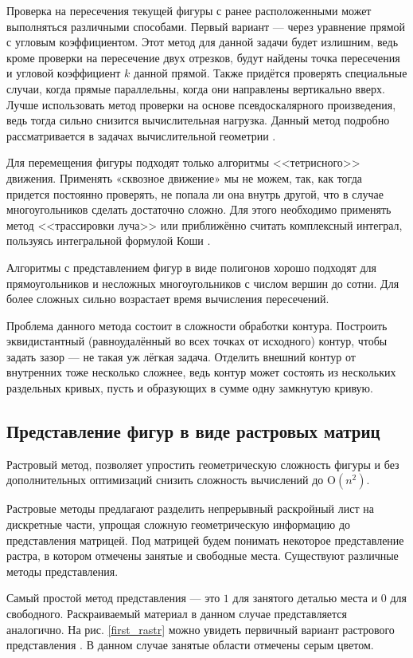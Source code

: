 \documentclass[14pt]{extarticle}
\begin{document}
	Проверка на пересечения текущей фигуры с ранее расположенными может выполняться различными способами. Первый вариант --- через уравнение прямой с угловым коэффициентом. Этот метод для данной задачи будет излишним, ведь кроме проверки на пересечение двух отрезков, будут найдены точка пересечения и угловой коэффициент $k$ данной прямой. Также придётся проверять специальные случаи, когда прямые параллельны, когда они направлены вертикально вверх. Лучше использовать метод проверки на основе псевдоскалярного произведения, ведь тогда сильно снизится вычислительная нагрузка. Данный метод подробно рассматривается в задачах вычислительной геометрии \cite{Parsolov}.


	Для перемещения фигуры подходят только алгоритмы <<тетрисного>> движения. Применять «сквозное движение» мы не можем, так, как тогда придется постоянно проверять, не попала ли она внутрь другой, что в случае многоугольников сделать достаточно сложно. Для этого необходимо применять метод <<трассировки луча>> или приближённо считать комплексный интеграл, пользуясь интегральной формулой Коши \cite{Shabat}.


	Алгоритмы с представлением фигур в виде полигонов хорошо подходят для прямоугольников и несложных многоугольников с числом вершин до сотни. Для более сложных сильно возрастает время вычисления пересечений.


	Проблема данного метода состоит в сложности обработки контура. Построить эквидистантный (равноудалённый во всех точках от исходного) контур, чтобы задать зазор --- не
	такая уж лёгкая задача. Отделить внешний контур от внутренних тоже несколько сложнее,
	ведь контур может состоять из нескольких раздельных кривых, пусть и образующих в
	сумме одну замкнутую кривую.
	\subsection{Представление фигур в виде растровых матриц}
	Растровый метод, позволяет упростить геометрическую сложность фигуры и без дополнительных оптимизаций снизить сложность вычислений до $\mathrm{O}(n^2)$.


	Растровые методы предлагают разделить непрерывный раскройный лист на дискретные части, упрощая сложную геометрическую информацию до представления матрицей. Под матрицей будем понимать некоторое представление растра, в котором отмечены занятые и свободные места. Существуют различные методы представления.


	Самый простой метод представления --- это $1$ для занятого деталью места и $0$ для свободного. Раскраиваемый материал в данном случае представляется аналогично. На рис. \ref{first_rastr}
	можно увидеть первичный вариант растрового представления \cite{Benell_Olivera}. В данном случае занятые области отмечены серым цветом.
\end{document}
